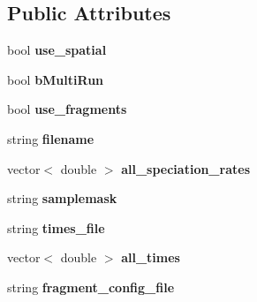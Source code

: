 \subsection*{Public Attributes}
\begin{DoxyCompactItemize}
\item 
bool {\bfseries use\+\_\+spatial}\hypertarget{struct_spec_sim_parameters_a7baa6db5f411b4fdb9dd5fae0fd25a26}{}\label{struct_spec_sim_parameters_a7baa6db5f411b4fdb9dd5fae0fd25a26}

\item 
bool {\bfseries b\+Multi\+Run}\hypertarget{struct_spec_sim_parameters_a7ca69d2db2aaf8cdcc62b1ec854f72bf}{}\label{struct_spec_sim_parameters_a7ca69d2db2aaf8cdcc62b1ec854f72bf}

\item 
bool {\bfseries use\+\_\+fragments}\hypertarget{struct_spec_sim_parameters_ae2a8648d57c4b7df097bd450ab868e64}{}\label{struct_spec_sim_parameters_ae2a8648d57c4b7df097bd450ab868e64}

\item 
string {\bfseries filename}\hypertarget{struct_spec_sim_parameters_a39beb88bb0ce36265bb0b8c8468cbe48}{}\label{struct_spec_sim_parameters_a39beb88bb0ce36265bb0b8c8468cbe48}

\item 
vector$<$ double $>$ {\bfseries all\+\_\+speciation\+\_\+rates}\hypertarget{struct_spec_sim_parameters_af70bb0689f934fd5ec5ea1878a3e4011}{}\label{struct_spec_sim_parameters_af70bb0689f934fd5ec5ea1878a3e4011}

\item 
string {\bfseries samplemask}\hypertarget{struct_spec_sim_parameters_add68fe2a48b1d80173c5066bf9cd0f6c}{}\label{struct_spec_sim_parameters_add68fe2a48b1d80173c5066bf9cd0f6c}

\item 
string {\bfseries times\+\_\+file}\hypertarget{struct_spec_sim_parameters_a83a3ce34449db0152e0012838c0ac3a6}{}\label{struct_spec_sim_parameters_a83a3ce34449db0152e0012838c0ac3a6}

\item 
vector$<$ double $>$ {\bfseries all\+\_\+times}\hypertarget{struct_spec_sim_parameters_a2a61028935128b94785b6faca0a5788f}{}\label{struct_spec_sim_parameters_a2a61028935128b94785b6faca0a5788f}

\item 
string {\bfseries fragment\+\_\+config\+\_\+file}\hypertarget{struct_spec_sim_parameters_adef81f827b1402d19f318c66f295c62a}{}\label{struct_spec_sim_parameters_adef81f827b1402d19f318c66f295c62a}


\end{DoxyCompactItemize}
